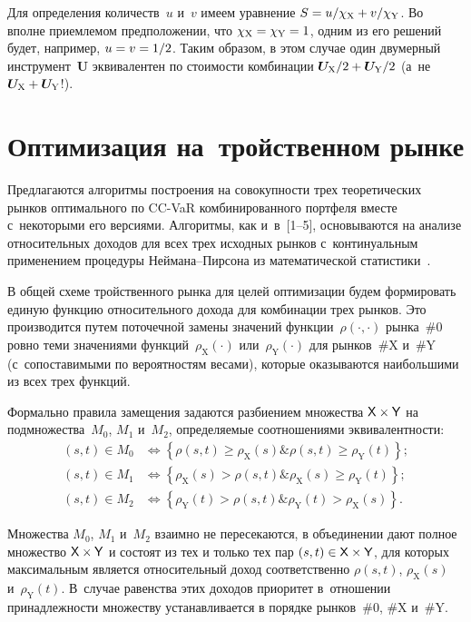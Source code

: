 \begin{multicols}{2}
  Для определения количеств~$u$ и~$v$ имеем уравнение $S \hm= 
u/\chi_{\mathrm{X}}\hm + v/\chi_{\mathrm{Y}}$. Во вполне приемлемом 
предположении, что $\chi_{\mathrm{X}}\hm = \chi_{\mathrm{Y}}\hm = 1$, одним из 
его решений будет, например, $u \hm= v \hm= 1/2$. Таким образом, в этом 
случае один двумерный инструмент~$\boldsymbol{U}$ эквивалентен по 
стоимости комбинации $\boldsymbol{U}_{\mathrm{X}}/2\hm+ 
\boldsymbol{U}_{\mathrm{Y}}/2$ (а~не $\boldsymbol{U}_{\mathrm{X}}\hm + 
\boldsymbol{U}_{\mathrm{Y}}$!). 
  
  \section{Оптимизация на~тройственном рынке}
  
  Предлагаются алгоритмы построения на совокупности трех теоретических 
рынков оптимального по CC-VaR комбинированного портфеля вместе 
с~некоторыми его версиями. Алгоритмы, как и~в~[1--5], основываются на 
анализе относительных доходов для всех трех исходных рынков 
с~континуальным применением процедуры Ней\-ма\-на--Пир\-со\-на из 
математической статистики~\cite{6-ag}. 
  
  В общей схеме тройственного рынка для целей оптимизации будем 
формировать единую функцию относительного дохода для комбинации трех 
рынков. Это производится путем поточечной замены значений 
функции~$\rho(\cdot,\cdot)$ рынка~\#0 ровно теми значениями 
функций~$\rho_{\mathrm{X}}(\cdot)$ или~$\rho_{\mathrm{Y}}(\cdot)$ для 
рынков~\#X и~\#Y (с~сопоставимыми по вероятностям весами), которые 
оказываются наибольшими из всех трех функций. 
  
  Формально правила замещения задаются разбиением множества ${\sf 
X}\times {\sf Y}$ на подмножества~$M_0$, $M_1$ и~$M_2$, определяемые 
соотношениями эквивалентности: 
  \begin{align}
  (s,t)\in M_0 &\Leftrightarrow \left\{ \rho(s,t)\geq 
\rho_{\mathrm{X}}(s)\&\rho(s,t)\geq \rho_{\mathrm{Y}}(t)\right\};\!\!
  \label{e3-ag}\\
  (s,t)\in M_1 &\Leftrightarrow \left\{ \rho_{\mathrm{X}}(s)> 
\rho(s,t)\&\rho_{\mathrm{X}}(s)\geq \rho_{\mathrm{Y}}(t)\right\};\!\!
  \label{e4-ag}\\
  (s,t)\in M_2 &\Leftrightarrow \left\{ \rho_{\mathrm{Y}}(t)> 
\rho(s,t)\&\rho_{\mathrm{Y}}(t)> \rho_{\mathrm{X}}(s)\right\}.\!\!
  \label{e5-ag}
  \end{align}
  
  Множества $M_0$, $M_1$ и~$M_2$ взаимно не пересекаются, в объединении 
дают полное множество ${\sf X}\times{\sf Y}$ и состоят из тех и только тех пар 
$(s,t) \hm\in {\sf X}\times{\sf Y}$, для которых максимальным является 
относительный доход соответственно $\rho(s, t)$, $\rho_{\mathrm{X}}(s)$ 
и~$\rho_{\mathrm{Y}}(t)$. В~случае равенства этих доходов приоритет 
в~отношении принадлежности множеству устанавливается в порядке 
рынков~\#0, \#X и~\#Y. 
  

\end{multicols}
